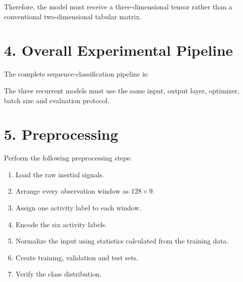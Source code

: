 \documentclass[10pt]{article}
\begin{document}
Therefore, the model must receive a three-dimensional tensor rather than a
conventional two-dimensional tabular matrix.

\section*{4. Overall Experimental Pipeline}

The complete sequence-classification pipeline is:

\begin{center}
\end{center}

The three recurrent models must use the same input, output layer, optimizer,
batch size and evaluation protocol.

\section*{5. Preprocessing}

Perform the following preprocessing steps:

\begin{enumerate}
\item Load the raw inertial signals.
\item Arrange every observation window as $128\times9$.
\item Assign one activity label to each window.
\item Encode the six activity labels.
\item Normalize the input using statistics calculated from the training data.
\item Create training, validation and test sets.
\item Verify the class distribution.
\end{enumerate}
\end{document}
